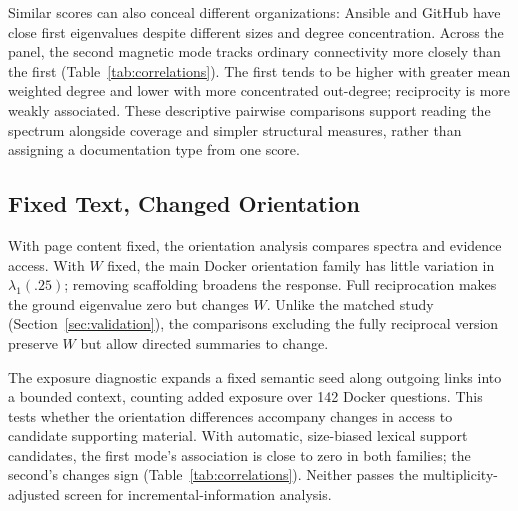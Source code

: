 Similar scores can also conceal different organizations: Ansible and GitHub
have close first eigenvalues despite different sizes and degree concentration.
Across the panel, the second magnetic mode tracks ordinary connectivity more
closely than the first (Table~\ref{tab:correlations}). The first tends to be
higher with greater mean weighted degree and lower with more concentrated
out-degree; reciprocity is more weakly associated. These descriptive pairwise
comparisons support reading the spectrum alongside coverage and simpler
structural measures, rather than assigning a documentation type from one score.

\subsection{Fixed Text, Changed Orientation}
With page content fixed, the orientation analysis compares spectra and evidence access.
With $W$ fixed, the main Docker orientation family has little variation in
$\lambda_1(.25)$; removing scaffolding broadens the response. Full reciprocation makes the ground eigenvalue zero
but changes $W$. Unlike the matched study (Section~\ref{sec:validation}),
the comparisons excluding the fully reciprocal version preserve $W$ but allow directed summaries to change.

The exposure diagnostic expands a fixed semantic seed along outgoing links
into a bounded context, counting added exposure over 142 Docker questions.
This tests whether the orientation differences accompany changes in access to
candidate supporting material.
With automatic, size-biased lexical support candidates, the first mode's
association is close to zero in both families; the second's changes sign
(Table~\ref{tab:correlations}). Neither passes the multiplicity-adjusted screen
for incremental-information analysis.
